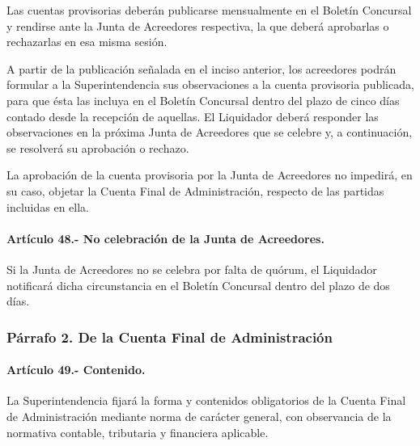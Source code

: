 \documentclass[
]{book}
\begin{document}
Las cuentas provisorias deberán publicarse mensualmente en el Boletín Concursal y rendirse ante la Junta de Acreedores respectiva, la que deberá aprobarlas o rechazarlas en esa misma sesión.

A partir de la publicación señalada en el inciso anterior, los acreedores podrán formular a la Superintendencia sus observaciones a la cuenta provisoria publicada, para que ésta las incluya en el Boletín Concursal dentro del plazo de cinco días contado desde la recepción de aquellas. El Liquidador deberá responder las observaciones en la próxima Junta de Acreedores que se celebre y, a continuación, se resolverá su aprobación o rechazo.

La aprobación de la cuenta provisoria por la Junta de Acreedores no impedirá, en su caso, objetar la Cuenta Final de Administración, respecto de las partidas incluidas en ella.

\hypertarget{artuxedculo-48.--no-celebraciuxf3n-de-la-junta-de-acreedores.}{%
\paragraph*{Artículo 48.- No celebración de la Junta de Acreedores.}\label{artuxedculo-48.--no-celebraciuxf3n-de-la-junta-de-acreedores.}}

Si la Junta de Acreedores no se celebra por falta de quórum, el Liquidador notificará dicha circunstancia en el Boletín Concursal dentro del plazo de dos días.

\hypertarget{puxe1rrafo-2.-de-la-cuenta-final-de-administraciuxf3n}{%
\subsubsection*{Párrafo 2. De la Cuenta Final de Administración}\label{puxe1rrafo-2.-de-la-cuenta-final-de-administraciuxf3n}}

\hypertarget{artuxedculo-49.--contenido.}{%
\paragraph*{Artículo 49.- Contenido.}\label{artuxedculo-49.--contenido.}}

La Superintendencia fijará la forma y contenidos obligatorios de la Cuenta Final de Administración mediante norma de carácter general, con observancia de la normativa contable, tributaria y financiera aplicable.
\end{document}
